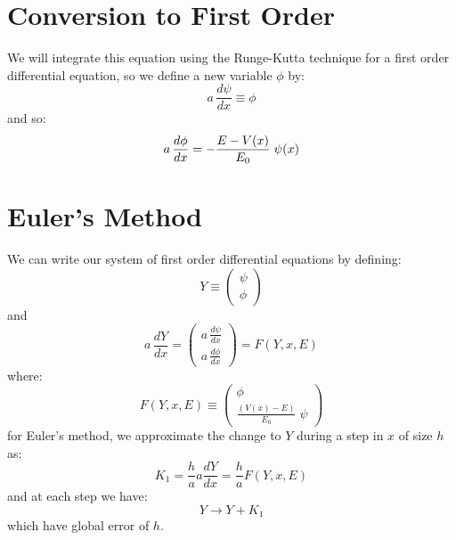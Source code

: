 \documentclass[12pt]{article}
\begin{document}
\section{Conversion to First Order}

We will integrate this equation using the Runge-Kutta technique for a
first order differential equation, so we define a new variable $\phi$
by:
\begin{equation}
a \, \frac{d\psi}{dx} \equiv \phi
\end{equation}
and so:
\begin{equation}
a \, \frac{d\phi}{dx} = - \frac{E - V(x)}{E_0} \; \psi(x)\\
\end{equation}

\section{Euler's Method}
We can write our system of first order differential equations by defining:
\begin{equation}
Y \equiv \begin{pmatrix} \psi \\ \phi \end{pmatrix}
\end{equation}
and
\begin{equation}
a \, \frac{dY}{dx} = \begin{pmatrix} {\displaystyle a \, \frac{d\psi}{dx}} \\[10pt] {\displaystyle a \, \frac{d\phi}{dx}} \end{pmatrix} = F(Y,x,E)
\end{equation}
where:
\begin{equation}
F(Y,x,E) \equiv \begin{pmatrix} \phi \\ \displaystyle \frac{(V(x)-E)}{E_0}\;\psi \end{pmatrix}
\end{equation}
for Euler's method, we approximate the change to $Y$ during a step in $x$ of size $h$ as:
$$K_1 = \frac{h}{a} a \frac{dY}{dx} = \frac{h}{a} F(Y, x, E)$$
and at each step we have:
$$Y \to Y + K_1$$
which have global error of $h$.
\end{document}

